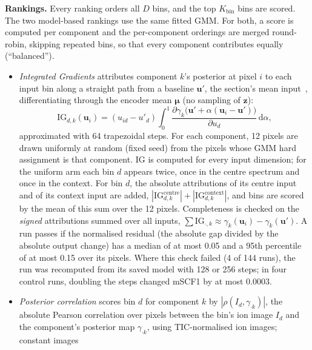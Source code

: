 \textbf{Rankings.} Every ranking orders all $D$ bins, and the top
$K_{\text{bin}}$ bins are scored. The two model-based rankings use the same
fitted GMM. For both, a score is computed per component and the per-component
orderings are merged round-robin, skipping repeated bins, so that every
component contributes equally (``balanced'').
\begin{itemize}
  \item \emph{Integrated Gradients} attributes component $k$'s posterior at
        pixel $i$ to each input bin along a straight path from a baseline
        $\mathbf{u}'$, the section's mean input~\citep{sundararajan2017axiomatic},
        differentiating through the encoder mean $\boldsymbol{\mu}$ (no
        sampling of $\mathbf{z}$):
        \begin{equation}
        \mathrm{IG}_{d,k}(\mathbf{u}_i)=(u_{id}-u'_d)\int_0^1
        \frac{\partial\gamma_k\big(\mathbf{u}'+\alpha(\mathbf{u}_i-\mathbf{u}')\big)}
        {\partial u_{d}}\,\mathrm{d}\alpha ,
        \end{equation}
        approximated with 64 trapezoidal steps. For each component, 12 pixels
        are drawn uniformly at random (fixed seed) from the pixels whose GMM
        hard assignment is that component. IG is computed for every input
        dimension; for the uniform arm each bin $d$ appears twice, once in the
        centre spectrum and once in the context. For bin $d$, the absolute
        attributions of its centre input and of its context input are added,
        $|\mathrm{IG}^{\text{centre}}_{d,k}|+|\mathrm{IG}^{\text{context}}_{d,k}|$,
        and bins are scored by the mean of this sum over the 12 pixels.
        Completeness is checked on the \emph{signed} attributions summed over
        all inputs, $\sum\mathrm{IG}_{\cdot,k}\approx
        \gamma_k(\mathbf{u}_i)-\gamma_k(\mathbf{u}')$. A run passes if the
        normalised residual (the absolute gap divided by the absolute output
        change) has a median of at most 0.05 and a 95th percentile of at most
        0.15 over its pixels.
        Where this check failed (4 of 144 runs), the run was recomputed from
        its saved model with 128 or 256 steps; in four control runs, doubling
        the steps changed mSCF1 by at most 0.0003.
  \item \emph{Posterior correlation} scores bin $d$ for component $k$ by
        $|\rho(I_d,\gamma_{\cdot k})|$, the absolute Pearson correlation over
        pixels between the bin's ion image $I_d$ and the component's posterior
        map $\gamma_{\cdot k}$, using TIC-normalised ion images; constant images

\end{itemize}
